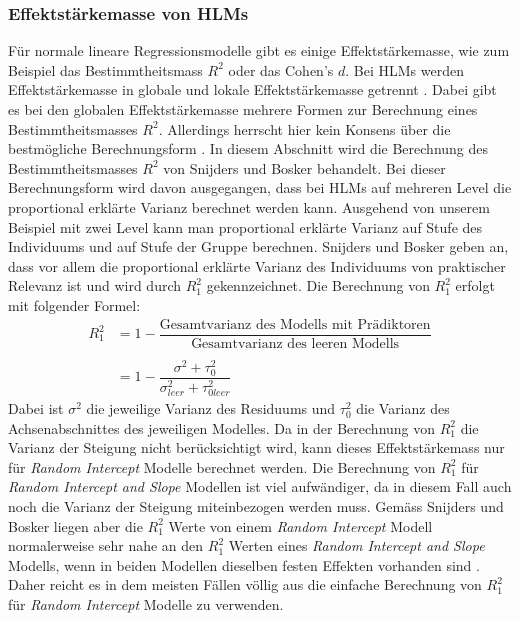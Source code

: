 \documentclass[12pt]{article}\usepackage[]{graphicx}\usepackage[]{color}
\begin{document}
\subsubsection{Effektstärkemasse von HLMs}
Für normale lineare Regressionsmodelle gibt es einige Effektstärkemasse, wie zum Beispiel das Bestimmtheitsmass $R^2$ oder das Cohen's $d$. Bei HLMs werden Effektstärkemasse in globale und lokale Effektstärkemasse getrennt \citep{PEUGH201085}. Dabei gibt es bei den globalen Effektstärkemasse mehrere Formen zur Berechnung eines Bestimmtheitsmasses $R^2$. Allerdings herrscht hier kein Konsens über die bestmögliche Berechnungsform \citep{raudenbush2002hierarchical,SnijdersTomA.B2012Ma:a}. In diesem Abschnitt wird die Berechnung des Bestimmtheitsmasses $R^2$ von Snijders und Bosker \citeyearpar{SnijdersTomA.B2012Ma:a} behandelt. Bei dieser Berechnungsform wird davon ausgegangen, dass bei HLMs auf mehreren Level die proportional erklärte Varianz berechnet werden kann. Ausgehend von unserem Beispiel mit zwei Level kann man proportional erklärte Varianz auf Stufe des Individuums und auf Stufe der Gruppe berechnen. Snijders und Bosker \citeyearpar{SnijdersTomA.B2012Ma:a} geben an, dass vor allem die proportional erklärte Varianz des Individuums von praktischer Relevanz ist und wird durch $R_{1}^2$ gekennzeichnet. Die Berechnung von $R_{1}^2$ erfolgt mit folgender Formel:
\begin{equation} \label{eq:r_square}
\begin{split}	
 R_{1}^2 & = 1 - \dfrac{\text{Gesamtvarianz des Modells mit Prädiktoren}}{\text{Gesamtvarianz des leeren Modells}} \\
 & \\
 & = 1 - \dfrac{\sigma^2 + \tau_{0}^2}{\sigma_{leer}^2 + \tau_{0leer}^2}
\end{split}	
\end{equation}
Dabei ist $\sigma^2$ die jeweilige Varianz des Residuums und $\tau_{0}^2$ die Varianz des Achsenabschnittes des jeweiligen Modelles. Da in der Berechnung von $R_{1}^2$ die Varianz der Steigung nicht berücksichtigt wird, kann dieses Effektstärkemass nur für \textit{Random Intercept} Modelle berechnet werden. Die Berechnung von $R_{1}^2$ für \textit{Random Intercept and Slope} Modellen ist viel aufwändiger, da in diesem Fall auch noch die Varianz der Steigung miteinbezogen werden muss. Gemäss Snijders und Bosker liegen aber die $R_{1}^2$ Werte von einem \textit{Random Intercept} Modell normalerweise sehr nahe an den $R_{1}^2$ Werten eines \textit{Random Intercept and Slope} Modells, wenn in beiden Modellen dieselben festen Effekten vorhanden sind \citep{SnijdersTomA.B2012Ma:a}. Daher reicht es in dem meisten Fällen völlig aus die einfache Berechnung von $R_{1}^2$ für \textit{Random Intercept} Modelle zu verwenden.
\end{document}
